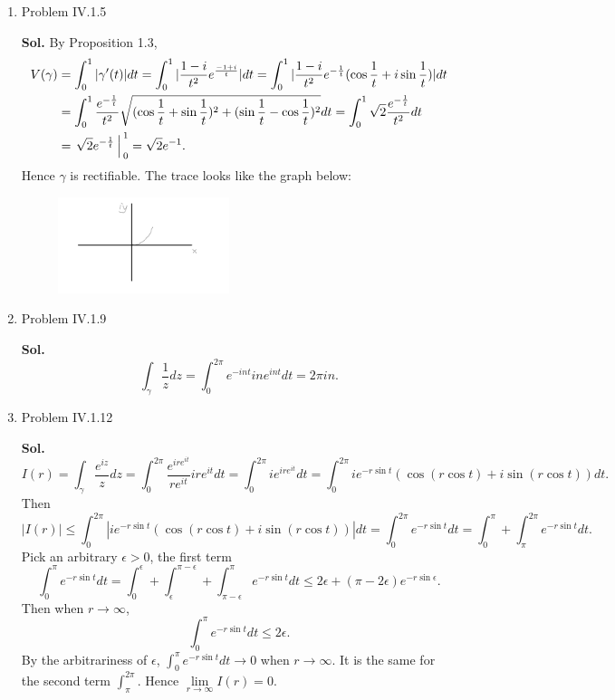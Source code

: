 \documentclass{article}%
\begin{document}
\begin{enumerate}


\item Problem IV.1.5

\textbf{Sol.} By Proposition 1.3, 
$$
\begin{aligned}
V(\gamma) &= \int_{0}^{1}|\gamma'(t)|dt = \int_0^1 |\frac{1-i}{t^2}e^{\frac{-1+i}{t}}|dt = \int_{0}^{1} |\frac{1-i}{t^2}e^{-\frac{1}{t}}(\cos\frac{1}{t}+i\sin\frac{1}{t})|dt \\
&= \int_0^1\frac{e^{-\frac{1}{t}}}{t^2}\sqrt{(\cos\frac{1}{t}+\sin\frac{1}{t})^2+(\sin\frac{1}{t}-\cos\frac{1}{t})^2}dt = \int_0^1\sqrt{2}\frac{e^{-\frac{1}{t}}}{t^2}dt \\
&= \left.\sqrt{2}e^{-\frac{1}{t}}\right\arrowvert_{0}^{1} = \sqrt{2}e^{-1}.
\end{aligned}
$$
Hence $\gamma$ is rectifiable. The trace looks like the graph below:
\begin{figure}[!htb] \centering
\includegraphics[width = 5cm]{prob1.jpg}
\end{figure}


\item Problem IV.1.9

\textbf{Sol.}
$$
\int_\gamma \frac{1}{z}dz = \int_{0}^{2\pi} e^{-int}ine^{int}dt = 2\pi in.
$$

\item Problem IV.1.12

\textbf{Sol.}
$$
I(r) = \int_{\gamma} \frac{e^{iz}}{z}dz = \int_{0}^{2\pi}\frac{e^{ire^{it}}}{re^{it}}ire^{it}dt = \int_{0}^{2\pi}ie^{ire^{it}}dt = \int_{0}^{2\pi}ie^{-r\sin t}(\cos(r\cos t)+i\sin(r\cos t))dt.
$$
Then 
$$
|I(r)| \le \int_{0}^{2\pi}|ie^{-r\sin t}(\cos(r\cos t)+i\sin(r\cos t))|dt = \int_0^{2\pi}e^{-r\sin t}dt = \int_{0}^{\pi}+\int_{\pi}^{2\pi}e^{-r\sin t}dt.
$$
Pick an arbitrary $\epsilon > 0$, the first term
$$
\int_{0}^{\pi}e^{-r\sin t}dt = \int_0^\epsilon + \int_\epsilon^{\pi-\epsilon} + \int_{\pi-\epsilon}^{\pi}e^{-r\sin t}dt \le 2\epsilon + (\pi-2\epsilon)e^{-r\sin\epsilon}.
$$
Then when $r \to \infty$,
$$
\int_{0}^{\pi}e^{-r\sin t}dt \le 2\epsilon.
$$
By the arbitrariness of $\epsilon$, $\int_{0}^{\pi}e^{-r\sin t}dt \to 0$ when $r\to \infty$. It is the same for the second term $\int_{\pi}^{2\pi} $. Hence $\lim\limits_{r\to\infty}I(r) = 0 $.


\end{enumerate}
\end{document}
